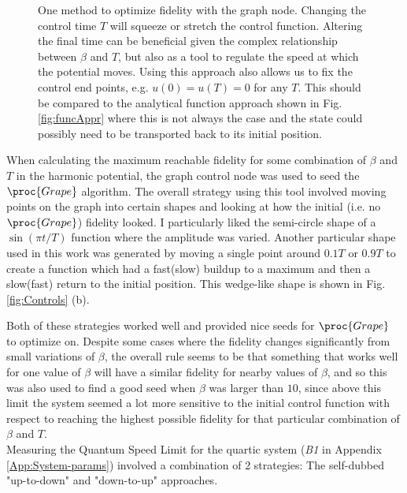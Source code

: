 \documentclass[a4paper, twocolumn]{revtex4-1}
\begin{document}
\begin{figure}
	\def\svgwidth{\columnwidth}
	
	\caption{One method to optimize fidelity with the graph node. Changing the control time $T$ will squeeze or stretch the control function. Altering the final time can be beneficial given the complex relationship between $\beta$ and $T$, but also as a tool to regulate the speed at which the potential moves. Using this approach also allows us to fix the control end points, e.g. $u(0)=u(T)=0$ for any $T$. This should be compared to the analytical function approach shown in Fig. \ref{fig:funcAppr} where this is not always the case and the state could possibly need to be transported back to its initial position.}
	\label{fig:graphAppr}
\end{figure}

When calculating the maximum reachable fidelity for some combination of $\beta$ and $T$ in the harmonic potential, the graph control node was used to seed the $\proc{Grape}$ algorithm. The overall strategy using this tool involved moving points on the graph into certain shapes and looking at how the initial (i.e. no $\proc{Grape}$) fidelity looked. I particularly liked the semi-circle shape of a $\sin(\pi t/T)$ function where the amplitude was varied. Another particular shape used in this work was generated by moving a single point around $0.1T$ or $0.9T$ to create a function which had a fast(slow) buildup to a maximum and then a slow(fast) return to the initial position. This wedge-like shape is shown in Fig. \ref{fig:Controls} (b).

Both of these strategies worked well and provided nice seeds for $\proc{Grape}$ to optimize on. Despite some cases where the fidelity changes significantly from small variations of $\beta$, the overall rule seems to be that something that works well for one value of $\beta$ will have a similar fidelity for nearby values of $\beta$, and so this was also used to find a good seed when $\beta$ was larger than $10$, since above this limit the system seemed a lot more sensitive to the initial control function with respect to reaching the highest possible fidelity for that particular combination of $\beta$ and $T$. \\

Measuring the Quantum Speed Limit for the quartic system (\textit{B1} in Appendix \ref{App:System-params}) involved a combination of 2 strategies: The self-dubbed "up-to-down" and "down-to-up" approaches. \\
\end{document}
